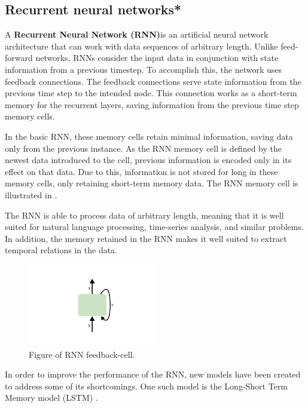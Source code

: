\subsection{Recurrent neural networks*}
\label{section:BT:RNN}

A \textbf{Recurrent Neural Network (RNN)}is an artificial neural network architecture that can work with data sequences of arbitrary length.
Unlike feed-forward networks, RNNs consider the input data in conjunction with state information from a previous timestep.
To accomplish this, the network uses feedback connections.
The feedback connections serve state information from the previous time step to the intended node.
This connection works as a short-term memory for the recurrent layers, saving information from the previous time step memory cells.

In the basic RNN, these memory cells retain minimal information, saving data only from the previous instance.
As the RNN memory cell is defined by the newest data introduced to the cell, previous information is encoded only in its effect on that data.
Due to this, information is not stored for long in these memory cells, only retaining short-term memory data.
The RNN memory cell is illustrated in .

The RNN is able to process data of arbitrary length, meaning that it is well suited for natural language processing, time-series analysis, and similar problems.
In addition, the memory retained in the RNN makes it well suited to extract temporal relations in the data.

\begin{figure}[h!]
  \centering
  \includegraphics[width=0.5\textwidth]{./sections/BT/figures/RNN.png}
  \hfill
  \caption{Figure of RNN feedback-cell.}
  \label{fig:rnn-cell}
\end{figure}



In order to improve the performance of the RNN, new models have been created to address some of its shortcomings.
One such model is the Long-Short Term Memory model (LSTM) \cite[p.~469-472]{Geron2017}.


